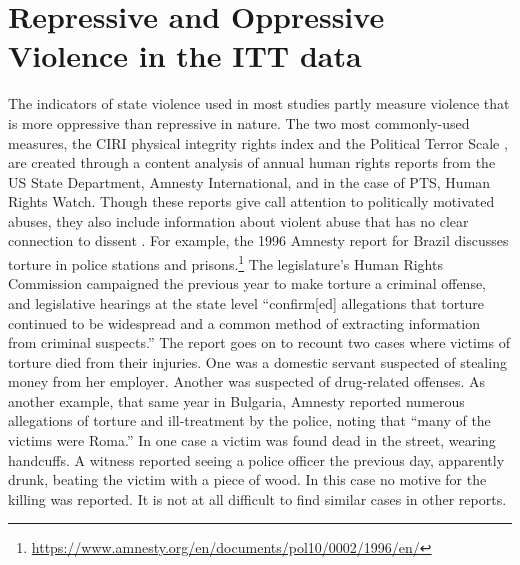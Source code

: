 \documentclass[11pt]{article}
\begin{document}
\section*{Repressive and Oppressive Violence in the ITT data} 
The indicators of state violence used in most studies partly measure violence that is more oppressive than repressive in nature. The two most commonly-used measures, the CIRI physical integrity rights index \citep{CIRI2014} and the Political Terror Scale \citep{PTS2018}, are created through a content analysis of annual human rights reports from the US State Department, Amnesty International, and in the case of PTS, Human Rights Watch. Though these reports give call attention to politically motivated abuses, they also include information about violent abuse that has no clear connection to dissent \citep[][pp.\ 13--16, 90--91]{Haschke2018}. 
For example, the 1996 Amnesty report for Brazil discusses torture in police stations and prisons.\footnote{\url{https://www.amnesty.org/en/documents/pol10/0002/1996/en/}} The legislature's Human Rights Commission campaigned the previous year to make torture a criminal offense, and legislative hearings at the state level ``confirm[ed] allegations that torture continued to be widespread and a common method of extracting information from criminal suspects.'' The report goes on to recount two cases where victims of torture died from their injuries. One was a domestic servant suspected of stealing money from her employer. Another was suspected of drug-related offenses. As another example, that same year in Bulgaria, Amnesty reported numerous allegations of torture and ill-treatment by the police, noting that ``many of the victims were Roma.'' In one case a victim was found dead in the street, wearing handcuffs. A witness reported seeing a police officer the previous day, apparently drunk, beating the victim with a piece of wood. In this case no motive for the killing was reported. It is not at all difficult to find similar cases in other reports. 
\end{document}
